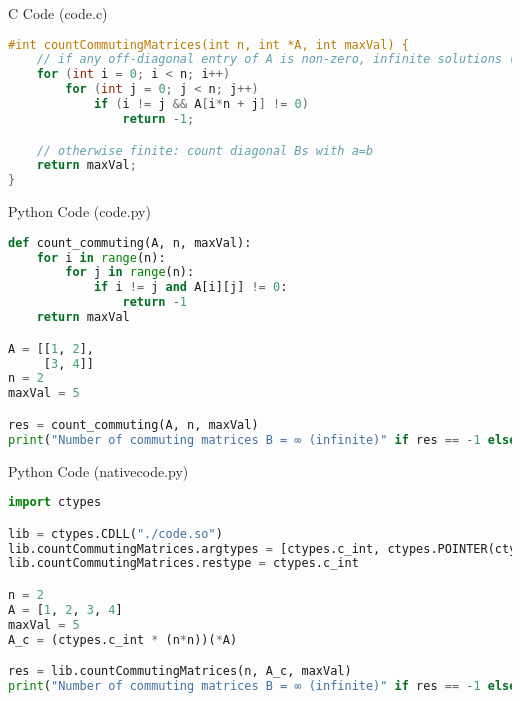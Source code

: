 \documentclass{beamer}
\begin{document}
\begin{frame}[fragile]{C Code (code.c)}
\begin{lstlisting}[language=C]
#int countCommutingMatrices(int n, int *A, int maxVal) {
    // if any off-diagonal entry of A is non-zero, infinite solutions (a=b)
    for (int i = 0; i < n; i++)
        for (int j = 0; j < n; j++)
            if (i != j && A[i*n + j] != 0)
                return -1;

    // otherwise finite: count diagonal Bs with a=b
    return maxVal;
}
\end{lstlisting}
\end{frame}
\begin{frame}[fragile]{Python Code (code.py)}
\begin{lstlisting}[language=Python]
def count_commuting(A, n, maxVal):
    for i in range(n):
        for j in range(n):
            if i != j and A[i][j] != 0:
                return -1
    return maxVal

A = [[1, 2],
     [3, 4]]
n = 2
maxVal = 5

res = count_commuting(A, n, maxVal)
print("Number of commuting matrices B = ∞ (infinite)" if res == -1 else f"Number of B = {res}")
\end{lstlisting}
\end{frame}
\begin{frame}[fragile]{Python Code (nativecode.py)}
\begin{lstlisting}[language=Python]
import ctypes

lib = ctypes.CDLL("./code.so")
lib.countCommutingMatrices.argtypes = [ctypes.c_int, ctypes.POINTER(ctypes.c_int), ctypes.c_int]
lib.countCommutingMatrices.restype = ctypes.c_int

n = 2
A = [1, 2, 3, 4]
maxVal = 5
A_c = (ctypes.c_int * (n*n))(*A)

res = lib.countCommutingMatrices(n, A_c, maxVal)
print("Number of commuting matrices B = ∞ (infinite)" if res == -1 else f"Number of B = {res}")
\end{lstlisting}
\end{frame}
\end{document}
